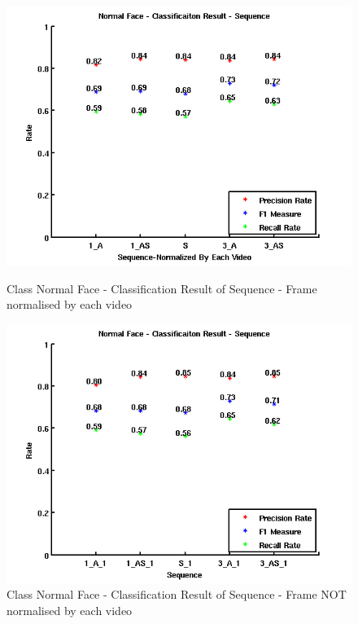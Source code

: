 \begin{figure}[ht]
\centering
\begin{minipage}{.5\textwidth}
  \centering
  \captionsetup{justification=centering,margin=1cm}
  \includegraphics[width=\linewidth]{imgs/Result_NormalFace_Sequence.png}
  \caption{Class Normal Face - Classification Result of Sequence - Frame normalised by each video}
  \label{fig:RNS}
\end{minipage}%
\begin{minipage}{.5\textwidth}
  \centering
  \captionsetup{justification=centering,margin=1cm}
  \includegraphics[width=\linewidth]{imgs/Result_NormalFace_Sequence_1.png}
  \caption{Class Normal Face - Classification Result of Sequence - Frame NOT normalised by each video}
  \label{fig:RNS1}
\end{minipage}
\end{figure}

